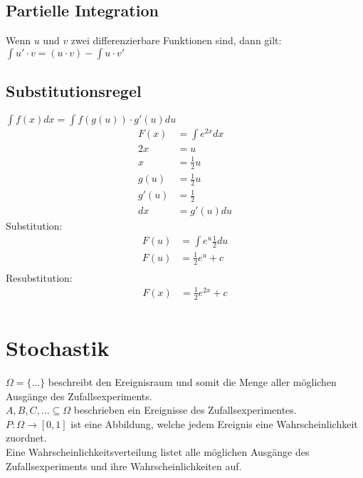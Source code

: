 \documentclass[a4paper, 8pt, landscape]{extarticle}
\let\oldint\int
\renewcommand{\int}{\ensuremath{\textstyle\oldint}}
\begin{document}
\begin{multicols*}{5}
        \subsection{Partielle Integration}
	        Wenn $u$ und $v$ zwei differenzierbare Funktionen sind, dann gilt: \\
	        $\int u' \cdot v = (u \cdot v) - \int u \cdot v'$
        \subsection{Substitutionsregel}
	        $\int f(x) dx = \int f(g(u)) \cdot g'(u) du$
	        \begin{align*}
	            F(x) &= \int e^{2x} dx\\
	            2x &= u\\
	            x &= \frac{1}{2}u\\
	            g(u) &= \frac{1}{2}u\\
	            g'(u) &= \frac{1}{2}\\
	            dx &= g'(u)du
	        \end{align*}
	        Substitution:
	        \begin{align*}
	        	F(u) &= \int e^u \frac{1}{2} du\\
	        	F(u) &= \frac{1}{2} e^u+c\\
	        \end{align*}
	        Resubstitution:
	        \begin{align*}
	    		F(x) &= \frac{1}{2} e^{2x}+c\\
	        \end{align*}
	        
	\section{Stochastik}
	    $\Omega = \{ ... \}$ beschreibt den Ereignisraum und somit die Menge aller möglichen Ausgänge des Zufallsexperiments.\\
    	$A, B, C, ... \subseteq \Omega$ beschrieben ein Ereignisse des Zufallsexperimentes.\\
    	$P: \Omega \rightarrow [0,1]$ ist eine Abbildung, welche jedem Ereignis eine Wahrscheinlichkeit zuordnet.\\
    	Eine Wahrscheinlichkeitsverteilung listet alle möglichen Ausgänge des Zufallsexperiments und ihre Wahrscheinlichkeiten auf.

\end{multicols*}
\end{document}
